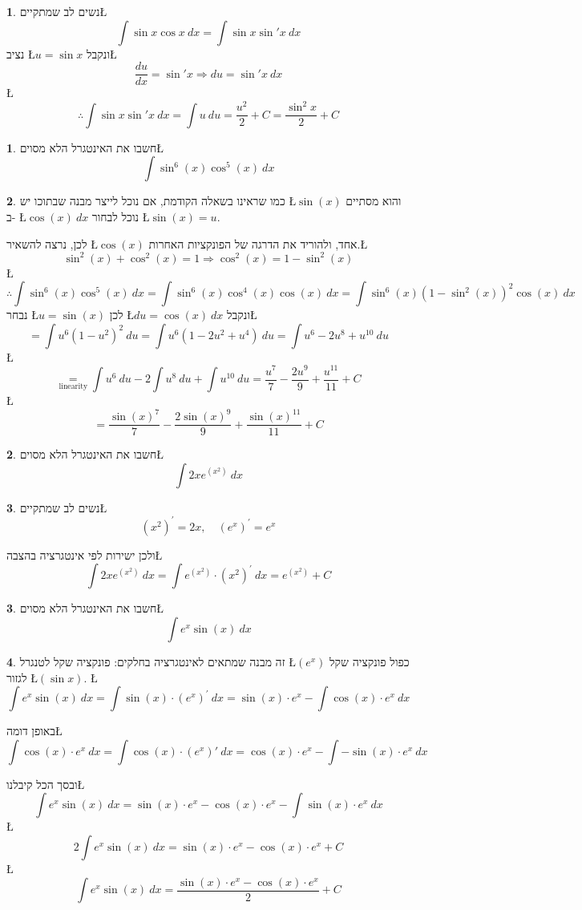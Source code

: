 \documentclass[english,hebrew]{article}
\theoremstyle{definition}
\newtheorem*{problem*}{\protect\problemname}
\theoremstyle{definition}
\newtheorem*{sol*}{\protect\solutionname}
\providecommand{\problemname}{בעיה}
\providecommand{\solutionname}{פתרון}
\begin{document}
\begin{sol*}
נשים לב שמתקיים\L{%
\[
\int\sin x\cos x\ dx=\int\sin x\sin'x\ dx
\]
}%
נציב \L{$u=\sin x$} ונקבל\L{%
\[
\frac{du}{dx}=\sin'x\Rightarrow du=\sin'x\ dx
\]
}%
\L{%
\[
\therefore\int\sin x\sin'x\ dx=\int u\ du=\frac{u^{2}}{2}+C=\frac{\sin^{2}x}{2}+C
\]
}%
\end{sol*}
\begin{problem*}
חשבו את האינטגרל הלא מסוים\L{%
\[
\int\sin^{6}(x)\cos^{5}(x)\ dx
\]
}%
\end{problem*}
\begin{sol*}
כמו שראינו בשאלה הקודמת, אם נוכל לייצר מבנה שבתוכו יש \L{$\sin(x)$}
והוא מסתיים ב- \L{$\cos(x)\ dx$} נוכל לבחור \L{$\sin(x)=u$}.

לכן, נרצה להשאיר \L{$\cos(x)$} אחד, ולהוריד את הדרגה של הפונקציות
האחרות.\L{%
\[
\sin^{2}(x)+\cos^{2}(x)=1\Rightarrow\cos^{2}(x)=1-\sin^{2}(x)
\]
}%
\L{%
\[
\therefore\int\sin^{6}(x)\cos^{5}(x)\ dx=\int\sin^{6}(x)\cos^{4}(x)\cos(x)\ dx=\int\sin^{6}(x)\left(1-\sin^{2}(x)\right)^{2}\cos(x)\ dx
\]
}%
נבחר \L{$u=\sin(x)$} לכן \L{$du=\cos(x)\ dx$} ונקבל\L{%
\[
=\int u^{6}\left(1-u^{2}\right)^{2}\ du=\int u^{6}\left(1-2u^{2}+u^{4}\right)\ du=\int u^{6}-2u^{8}+u^{10}\ du
\]
}%
\L{%
\[
\underset{\text{linearity}}{=}\int u^{6}\ du-2\int u^{8}\ du+\int u^{10}\ du=\frac{u^{7}}{7}-\frac{2u^{9}}{9}+\frac{u^{11}}{11}+C
\]
}%
\L{%
\[
=\frac{\sin(x)^{7}}{7}-\frac{2\sin(x)^{9}}{9}+\frac{\sin(x)^{11}}{11}+C
\]
}%
\end{sol*}
\begin{problem*}
חשבו את האינטגרל הלא מסוים\L{%
\[
\int2xe^{\left(x^{2}\right)}\ dx
\]
}%
\end{problem*}
\begin{sol*}
נשים לב שמתקיים\L{%
\[
\left(x^{2}\right)^{'}=2x,\quad\left(e^{x}\right)^{'}=e^{x}
\]
}%

ולכן ישירות לפי אינטגרציה בהצבה\L{%
\[
\int2xe^{\left(x^{2}\right)}\ dx=\int e^{\left(x^{2}\right)}\cdot\left(x^{2}\right)^{'}\ dx=e^{\left(x^{2}\right)}+C
\]
}%
\end{sol*}
\begin{problem*}
חשבו את האינטגרל הלא מסוים\L{%
\[
\int e^{x}\sin(x)\ dx
\]
}%
\end{problem*}
\begin{sol*}
זה מבנה שמתאים לאינטגרציה בחלקים: פונקציה שקל לטנגרל \L{$\left(e^{x}\right)$}
כפול פונקציה שקל לגזור \L{$\left(\sin x\right)$}. \L{%
\[
\int e^{x}\sin(x)\ dx=\int\sin(x)\cdot\left(e^{x}\right)^{'}\ dx=\sin(x)\cdot e^{x}-\int\cos(x)\cdot e^{x}\ dx
\]
}%

באופן דומה\L{%
\[
\int\cos(x)\cdot e^{x}\ dx=\int\cos(x)\cdot\left(e^{x}\right)'\ dx=\cos(x)\cdot e^{x}-\int-\sin(x)\cdot e^{x}\ dx
\]
}%

ובסך הכל קיבלנו\L{%
\[
\int e^{x}\sin(x)\ dx=\sin(x)\cdot e^{x}-\cos(x)\cdot e^{x}-\int\sin(x)\cdot e^{x}\ dx
\]
}%
\L{%
\[
2\int e^{x}\sin(x)\ dx=\sin(x)\cdot e^{x}-\cos(x)\cdot e^{x}+C
\]
}%
\L{%
\[
\int e^{x}\sin(x)\ dx=\frac{\sin(x)\cdot e^{x}-\cos(x)\cdot e^{x}}{2}+C
\]
}%
\end{sol*}
\end{document}
